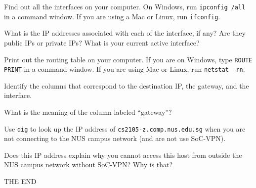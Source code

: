 \documentclass[a4paper,11pt]{exam}
\begin{document}
\begin{questions}
\question
Find out all the interfaces on your computer.  On Windows, run \texttt{ipconfig /all} in a command window.  If you are using a Mac or Linux, run \texttt{ifconfig}.

What is the IP addresses associated with each of the interface, if any?  Are they public IPs or private IPs?  What is your current active interface?

\question

Print out the routing table on your computer.  If you are on Windows, type \texttt{ROUTE PRINT} in a command window.  If you are using Mac or Linux, run \texttt{netstat -rn}.

Identify the columns that correspond to the destination IP, the gateway, and the interface.  

What is the meaning of the column labeled ``gateway''?

\question

Use \texttt{dig} to look up the IP address of \texttt{cs2105-z.comp.nus.edu.sg} when you are not connecting to the NUS campus network (and are not use SoC-VPN).

Does this IP address explain why you cannot access this host from outside the NUS campus network without SoC-VPN?  Why is that?

\end{questions}

\vfill
\begin{center}
    \textsf{\Huge THE END}
\end{center}
\end{document}
